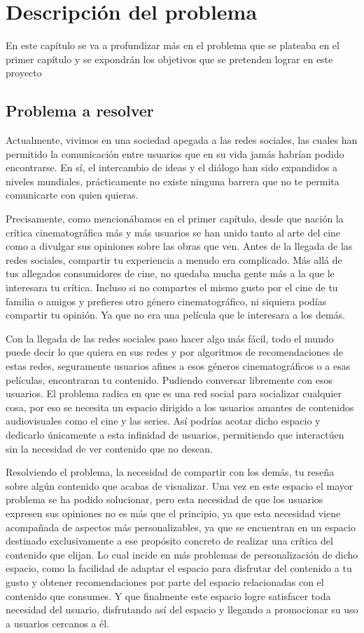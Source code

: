 \chapter{Descripción del problema}

En este capítulo se va a profundizar más en el problema que se plateaba en el primer capítulo y se 
expondrán los objetivos que se pretenden lograr en este proyecto

\section{Problema a resolver}
Actualmente, vivimos en una sociedad apegada a las redes sociales, las cuales han permitido la 
comunicación entre usuarios que en su vida jamás habrían podido encontrarse. En sí, el intercambio de 
ideas y el diálogo han sido expandidos a niveles mundiales, prácticamente no existe ninguna barrera que 
no te permita comunicarte con quien quieras. 

Precisamente, como mencionábamos en el primer capítulo, desde que nación la crítica cinematográfica más 
y más usuarios se han unido tanto al arte del cine como a divulgar sus opiniones sobre las obras que 
ven. Antes de la llegada de las redes sociales, compartir tu experiencia a menudo era complicado. Más 
allá de tus allegados consumidores de cine, no quedaba mucha gente más a la que le interesara tu 
crítica. Incluso si no compartes el mismo gusto por el cine de tu familia o amigos y prefieres otro 
género cinematográfico, ni siquiera podías compartir tu opinión. Ya que no era una película que le 
interesara a los demás. 

Con la llegada de las redes sociales paso hacer algo más fácil, todo el mundo puede decir lo que quiera 
en sus redes y por algoritmos de recomendaciones de estas redes, seguramente usuarios afines a esos 
géneros cinematográficos o a esas películas, encontraran tu contenido. Pudiendo conversar libremente con 
esos usuarios. El problema radica en que es una red social para socializar cualquier cosa, por eso se 
necesita un espacio dirigido a los usuarios amantes de contenidos audiovisuales como el cine y las 
series. Así podrías acotar dicho espacio y dedicarlo únicamente a esta infinidad de usuarios, 
permitiendo que interactúen sin la necesidad de ver contenido que no desean.

Resolviendo el problema, la necesidad de compartir con los demás, tu reseña sobre algún contenido que 
acabas de visualizar. Una vez en este espacio el mayor problema se ha podido solucionar, pero esta 
necesidad de que los usuarios expresen sus opiniones no es más que el principio, ya que esta necesidad 
viene acompañada de aspectos más personalizables, ya que se encuentran en un espacio destinado 
exclusivamente a ese propósito concreto de realizar una crítica del contenido que elijan. Lo cual incide 
en más problemas de personalización de dicho espacio, como la facilidad de adaptar el espacio para 
disfrutar del contenido a tu gusto y obtener recomendaciones por parte del espacio relacionadas con el 
contenido que consumes. Y que finalmente este espacio logre satisfacer toda necesidad del usuario, 
disfrutando así del espacio y llegando a promocionar su uso a usuarios cercanos a él.

